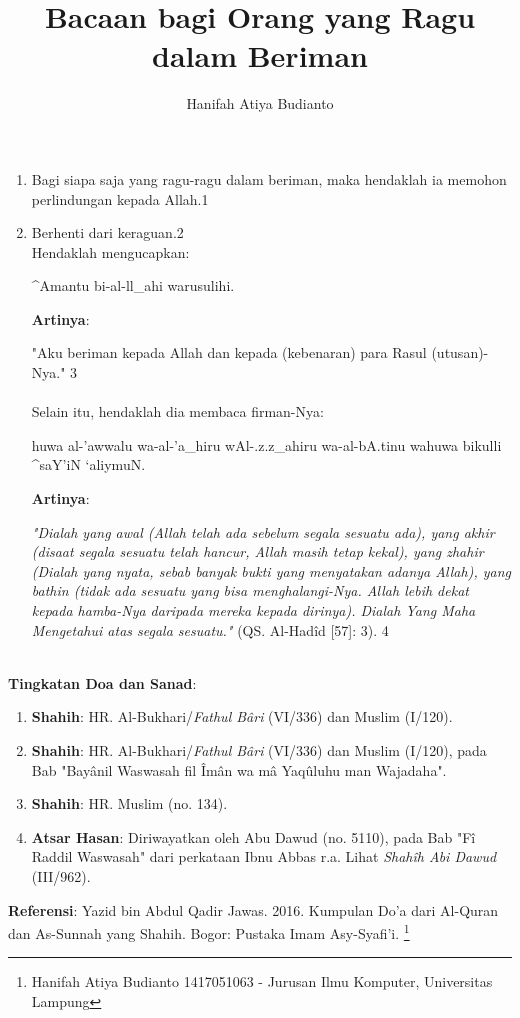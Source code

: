 \documentclass[a4paper,12pt]{article}
\title{\Large Bacaan bagi Orang yang Ragu dalam Beriman}
\author{\calligra Hanifah Atiya Budianto}
\begin{document}
\sffamily
\maketitle 
\fullvocalize
{}
\noindent
\begin{enumerate}
\item Bagi siapa saja yang ragu-ragu dalam beriman, maka hendaklah ia 
memohon perlindungan kepada Allah.{\scriptsize 1}
\item Berhenti dari keraguan.{\scriptsize 2}\\
\indent Hendaklah mengucapkan:\\
\begin{arabtext}
\noindent
^Amantu bi-al-ll_ahi warusulihi.\\
\end{arabtext}
\noindent
\textbf{Artinya}:
\par
\indent
"Aku beriman kepada Allah dan kepada (kebenaran) para Rasul (utusan)-Nya."
{\scriptsize 3}\\\\
\indent
Selain itu, hendaklah dia membaca firman-Nya: 
\begin{arabtext}
\noindent
huwa al-'awwalu wa-al-'a_hiru wAl-.z.z_ahiru wa-al-bA.tinu wahuwa bikulli 
^saY'iN `aliymuN.\\
\end{arabtext}
\noindent
\textbf{Artinya}:
\par
\indent
\textit{"Dialah yang awal (Allah telah ada sebelum segala sesuatu ada), 
yang akhir (disaat segala sesuatu telah hancur, Allah masih tetap kekal), 
yang zhahir (Dialah yang nyata, sebab banyak bukti yang menyatakan adanya 
Allah), yang bathin (tidak ada sesuatu yang bisa menghalangi-Nya. Allah 
lebih dekat kepada hamba-Nya daripada mereka kepada dirinya). Dialah Yang 
Maha Mengetahui atas segala sesuatu."} (QS. Al-Had\^{i}d [57]: 3).
{\scriptsize 4}\\\\
\end{enumerate}
\par
\noindent
\textbf{Tingkatan Doa dan Sanad}:
\begin{enumerate}
\item \textbf{Shahih}: HR. Al-Bukhari/\textit{Fathul B\^{a}ri} (VI/336) dan
Muslim (I/120).
\item \textbf{Shahih}: HR. Al-Bukhari/\textit{Fathul B\^{a}ri} (VI/336) dan
Muslim (I/120), pada Bab "Bay\^{a}nil Waswasah fil \^{I}m\^{a}n wa m\^{a} 
Yaq\^{u}luhu man Wajadaha".
\item \textbf{Shahih}: HR. Muslim (no. 134).
\item \textbf{Atsar Hasan}: Diriwayatkan oleh Abu Dawud (no. 5110), pada 
Bab "F\^{i} Raddil Waswasah" dari perkataan Ibnu Abbas r.a. Lihat 
\textit{Shah\^{i}h Abi Dawud} (III/962).
\end{enumerate}
\textbf{Referensi}: Yazid bin Abdul Qadir Jawas. 2016. Kumpulan Do'a dari
Al-Quran dan As-Sunnah yang Shahih. Bogor: Pustaka Imam Asy-Syafi'i.
\footnote{Hanifah Atiya Budianto 1417051063 - Jurusan Ilmu Komputer,
Universitas Lampung}
\end{document}
